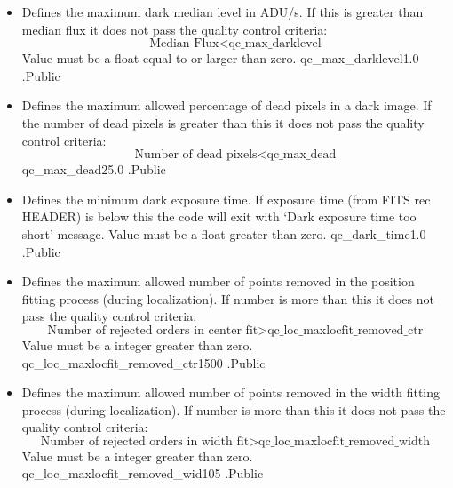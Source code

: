 \begin{itemize}

\item {}
{Defines the maximum dark median level in ADU/s. If this is greater than median flux it does not pass the quality control criteria:
\begin{equation}
\text{Median Flux} < \text{qc\_max\_darklevel}
\end{equation}
Value must be a float equal to or larger than zero. 
}
{qc\_max\_darklevel}{1.0}
{\calDARK}{\constantsfile}{\calDARK.\progMAIN}{Public}


\item {}
{Defines the maximum allowed percentage of dead pixels in a dark image. If the number of dead pixels is greater than this it does not pass the quality control criteria:
\begin{equation}
\text{Number of dead pixels} < \text{qc\_max\_dead}
\end{equation}
}
{qc\_max\_dead}{25.0}
{\calDARK}{\constantsfile}{\calDARK.\progMAIN}{Public}


\item {}
{Defines the minimum dark exposure time. If exposure time (from FITS rec HEADER) is below this the code will exit with `Dark exposure time too short' message. Value must be a float greater than zero.}
{qc\_dark\_time}{1.0}
{\calDARK}{\constantsfile}{\calDARK.\progMAIN}{Public}


\item {}
{Defines the maximum allowed number of points removed in the position fitting process (during localization). If number is more than this it does not pass the quality control criteria: 
\begin{equation}
\text{Number of rejected orders in center fit} >\text{qc\_loc\_maxlocfit\_removed\_ctr}
\end{equation}
Value must be a integer greater than zero.
}
{qc\_loc\_maxlocfit\_removed\_ctr}{1500}
{\callocRAW}{\constantsfile}{\callocRAW.\progMAIN}{Public}


\item {}
{Defines the maximum allowed number of points removed in the width fitting process (during localization). If number is more than this it does not pass the quality control criteria: 
\begin{equation}
\text{Number of rejected orders in width fit} >\text{qc\_loc\_maxlocfit\_removed\_width}
\end{equation}
Value must be a integer greater than zero.
}
{qc\_loc\_maxlocfit\_removed\_wid}{105}
{\callocRAW}{\constantsfile}{\callocRAW.\progMAIN}{Public}



\end{itemize}
